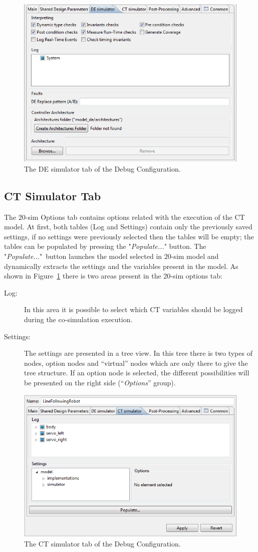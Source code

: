 \documentclass{crescendorepchap}
\begin{document}
\begin{figure}[htbp]
\centering
\includegraphics[width=.6\textwidth]{images/DestecsDebugConfigurationDESimulator.png}
\caption{The DE simulator tab of the Debug Configuration.}
\end{figure}

\subsection{CT Simulator Tab}

The 20-sim Options tab contains options related with the execution of
the CT model. At first, both tables (Log and Settings) contain only the
previously saved settings, if no settings were previously selected then
the tables will be empty; the tables can be populated by pressing the
"\emph{Populate...}" button. The "\emph{Populate..}."~button launches
the model selected in 20-sim model and dynamically extracts the settings
and the variables present in the model. As shown in Figure~\ref{fig:CTSimInDebug} there is two areas present
in the 20-sim options tab:

\begin{description}
\item[Log:] In this area it is possible to select which CT variables
  should be logged during the co-simulation execution.
\item[Settings:] The settings are presented in a tree view. In this tree
  there is two types of nodes, option nodes and ``virtual'' nodes which
  are only there to give the tree structure. If an option node is
  selected, the different possibilities will be presented on the right
  side (``\emph{Options}'' group).
\end{description}


\begin{figure}[htbp]
\centering
\includegraphics[width=.6\textwidth]{images/DestecsDebugConfigurationCTSimulator.png}
\caption{The CT simulator tab of the Debug Configuration.\label{fig:CTSimInDebug}}
\end{figure}
\end{document}
